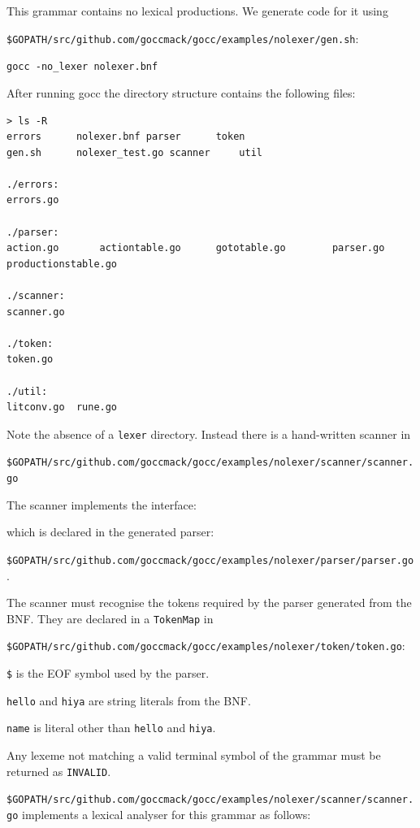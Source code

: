 \documentclass[12pt]{article}
\begin{document}
    This grammar contains no lexical productions. We generate code for it using

    \verb|$GOPATH/src/github.com/goccmack/gocc/examples/nolexer/gen.sh|:

    \verb|gocc -no_lexer nolexer.bnf|

    After running gocc the directory structure contains the following files:
    \begin{verbatim}
> ls -R
errors		nolexer.bnf	parser		token
gen.sh		nolexer_test.go	scanner		util

./errors:
errors.go

./parser:
action.go		actiontable.go		gototable.go		parser.go		productionstable.go

./scanner:
scanner.go

./token:
token.go

./util:
litconv.go	rune.go
    \end{verbatim}

    Note the absence of a \verb|lexer| directory. Instead there is a hand-written scanner in

    \verb|$GOPATH/src/github.com/goccmack/gocc/examples/nolexer/scanner/scanner.go|

    The scanner implements the interface:

    

    which is declared in the generated parser:

    \verb|$GOPATH/src/github.com/goccmack/gocc/examples/nolexer/parser/parser.go|.

    The scanner must recognise the tokens required by the parser generated from the BNF. They are declared in a \verb|TokenMap| in

    \verb|$GOPATH/src/github.com/goccmack/gocc/examples/nolexer/token/token.go|:

    

    \verb|$| is the EOF symbol used by the parser.

    \verb|hello| and \verb|hiya| are string literals from the BNF.

    \verb|name| is literal other than \verb|hello| and \verb|hiya|.

    Any lexeme not matching a valid terminal symbol of the grammar must be returned as \verb|INVALID|.

    \verb|$GOPATH/src/github.com/goccmack/gocc/examples/nolexer/scanner/scanner.go| implements a lexical analyser for this grammar as follows:
\end{document}
